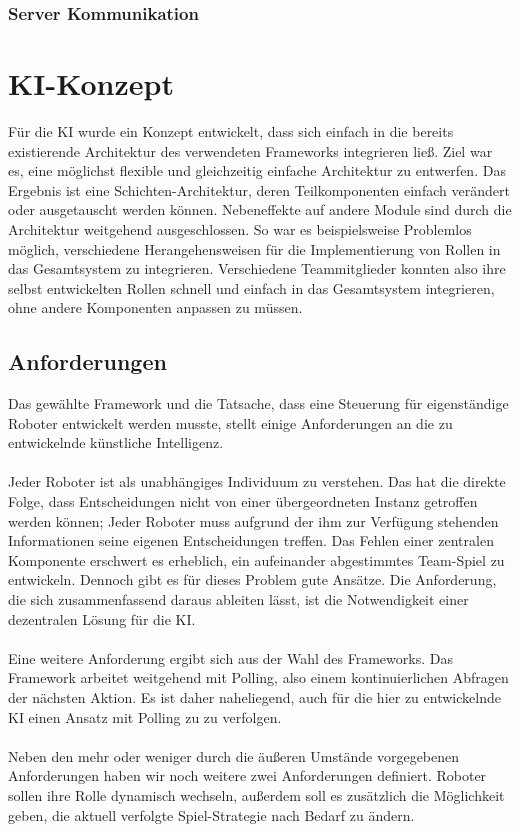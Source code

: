 \documentclass[fontsize=12pt,a4paper,final]{scrartcl}[2003/01/01]
\begin{document}
\subsubsection{Server Kommunikation}

\section{KI-Konzept}
Für die KI wurde ein Konzept entwickelt, dass sich einfach in die bereits existierende Architektur des verwendeten Frameworks integrieren ließ. Ziel war es, eine möglichst flexible und gleichzeitig einfache Architektur zu entwerfen. Das Ergebnis ist eine Schichten-Architektur, deren Teilkomponenten einfach verändert oder ausgetauscht werden können. Nebeneffekte auf andere Module sind durch die Architektur weitgehend ausgeschlossen. So war es beispielsweise Problemlos möglich, verschiedene Herangehensweisen für die Implementierung von Rollen in das Gesamtsystem zu integrieren. Verschiedene Teammitglieder konnten also ihre selbst entwickelten Rollen schnell und einfach in das Gesamtsystem integrieren, ohne andere Komponenten anpassen zu müssen.

\subsection{Anforderungen}
Das gewählte Framework und die Tatsache, dass eine Steuerung für eigenständige Roboter entwickelt werden musste, stellt einige Anforderungen an die zu entwickelnde künstliche Intelligenz.\\
\\
Jeder Roboter ist als unabhängiges Individuum zu verstehen. Das hat die direkte Folge, dass Entscheidungen nicht von einer übergeordneten Instanz getroffen werden können; Jeder Roboter muss aufgrund der ihm zur Verfügung stehenden Informationen seine eigenen Entscheidungen treffen. Das Fehlen einer zentralen Komponente erschwert es erheblich, ein aufeinander abgestimmtes Team-Spiel zu entwickeln. Dennoch gibt es für dieses Problem gute Ansätze. Die Anforderung, die sich zusammenfassend daraus ableiten lässt, ist die Notwendigkeit einer dezentralen Lösung für die KI.\\
\\
Eine weitere Anforderung ergibt sich aus der Wahl des Frameworks. Das Framework arbeitet weitgehend mit Polling, also einem kontinuierlichen Abfragen der nächsten Aktion. Es ist daher naheliegend, auch für die hier zu entwickelnde KI einen Ansatz mit Polling zu zu verfolgen.\\
\\
Neben den mehr oder weniger durch die äußeren Umstände vorgegebenen Anforderungen haben wir noch weitere zwei Anforderungen definiert. Roboter sollen ihre Rolle dynamisch wechseln, außerdem soll es zusätzlich die Möglichkeit geben, die aktuell verfolgte Spiel-Strategie nach Bedarf zu ändern.
\end{document}
